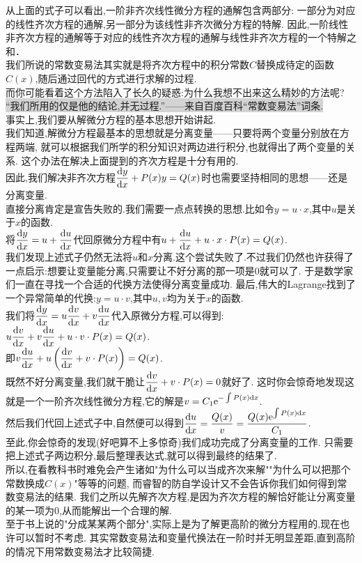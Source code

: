 \documentclass{ctexart}
\begin{document}
\begin{analyze}[关于常数变易法的说明]
    从上面的式子可以看出,一阶非齐次线性微分方程的通解包含两部分:
    一部分为对应的线性齐次方程的通解,另一部分为该线性非齐次微分方程的特解.
    因此,一阶线性非齐次方程的通解等于对应的线性齐次方程的通解与线性非齐次方程的一个特解之和．\\
    我们所说的常数变易法其实就是将齐次方程中的积分常数$C$替换成待定的函数$C(x)$,随后通过回代的方式进行求解的过程.\\
    而你可能看着这个方法陷入了长久的疑惑:为什么我想不出来这么精妙的方法呢?\\
    \colorbox{lightgray}{“我们所用的仅是他的结论,并无过程.”——来自百度百科“常数变易法”词条.}\\
    事实上,我们要从解微分方程的基本思想开始讲起.\\
    我们知道,解微分方程最基本的思想就是分离变量——只要将两个变量分别放在方程两端,
    就可以根据我们所学的积分知识对两边进行积分,也就得出了两个变量的关系.
    这个办法在解决上面提到的齐次方程是十分有用的.\\
    因此,我们解决非齐次方程$\dfrac{\mathrm{d} y}{\mathrm{d} x}+P(x)y=Q(x)$时也需要坚持相同的思想——还是分离变量.\\
    直接分离肯定是宣告失败的.我们需要一点点转换的思想.比如令$y=u\cdot x$,其中$u$是关于$x$的函数.\\
    将$\dfrac{\mathrm{d} y}{\mathrm{d} x}=u+\dfrac{\mathrm{d} u}{\mathrm{d} x}$代回原微分方程中有$u+\dfrac{\mathrm{d} u}{\mathrm{d} x}+u\cdot x\cdot P(x)=Q(x)$.\\
    我们发现上述式子仍然无法将$u$和$x$分离.这个尝试失败了.不过我们仍然也许获得了一点启示:想要让变量能分离,只需要让不好分离的那一项是0就可以了.
    于是数学家们一直在寻找一个合适的代换方法使得分离变量成功.
    最后,伟大的Lagrange找到了一个异常简单的代换:$y=u\cdot v$,其中$u,v$均为关于$x$的函数.\\
    我们将$\dfrac{\mathrm{d} y}{\mathrm{d} x}=u\dfrac{\mathrm{d} v}{\mathrm{d} x}+v\dfrac{\mathrm{d} u}{\mathrm{d} x}$代入原微分方程,可以得到:
    $u\dfrac{\mathrm{d} v}{\mathrm{d} x}+v\dfrac{\mathrm{d} u}{\mathrm{d} x}+u\cdot v\cdot P(x)=Q(x)$.\\
    即$v\dfrac{\mathrm{d} u}{\mathrm{d} x}+u\left(\dfrac{\mathrm{d} v}{\mathrm{d} x}+ v\cdot P(x)\right)=Q(x)$.\\
    既然不好分离变量,我们就干脆让$\dfrac{\mathrm{d} v}{\mathrm{d} x}+ v\cdot P(x)=0$就好了.
    这时你会惊奇地发现这就是一个一阶齐次线性微分方程,它的解是$v=C_1\mathrm{e}^{-\int{P(x)\mathrm{d}x}}$.\\
    然后我们代回上述式子中,自然便可以得到$\dfrac{\mathrm{d} u}{\mathrm{d} x}=\dfrac{Q(x)}{v}=\dfrac{Q(x)\mathrm{e}^{\int{P(x)\mathrm{d}x}}}{C_1}$.\\
    至此,你会惊奇的发现(好吧算不上多惊奇)我们成功完成了分离变量的工作.
    只需要把上述式子两边积分,最后整理表达式,就可以得到最终的结果了.\\
    所以,在看教科书时难免会产生诸如"为什么可以当成齐次来解""为什么可以把那个常数换成$C(x)$"等等的问题,
    而睿智的防自学设计又不会告诉你我们如何得到常数变易法的结果.
    我们之所以先解齐次方程,是因为齐次方程的解恰好能让分离变量的某一项为0,从而能解出一个合理的解.\\
    至于书上说的"分成某某两个部分",实际上是为了解更高阶的微分方程用的,现在也许可以暂时不考虑.
    其实常数变易法和变量代换法在一阶时并无明显差距,直到高阶的情况下用常数变易法才比较简捷.
\end{analyze}
\end{document}
